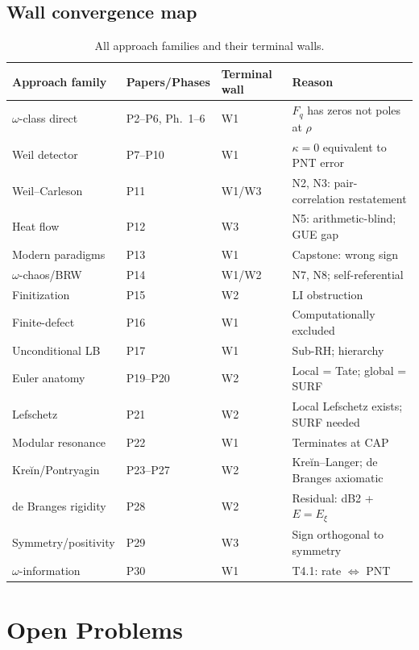 \documentclass[11pt]{amsart}
\theoremstyle{definition}
\theoremstyle{remark}
\newcommand{\om}{\omega}
\newcommand{\kap}{\kappa}
\begin{document}
\subsection{Wall convergence map}

\begin{table}[h]
\renewcommand{\arraystretch}{1.4}
\centering
\begin{tabular}{llll}
\toprule
Approach family & Papers/Phases & Terminal wall & Reason \\
\midrule
$\om$-class direct & P2--P6, Ph.~1--6 & W1 & $F_q$ has zeros not poles at $\rho$ \\
Weil detector & P7--P10 & W1 & $\kap=0$ equivalent to PNT error \\
Weil--Carleson & P11 & W1/W3 & N2, N3: pair-correlation restatement \\
Heat flow & P12 & W3 & N5: arithmetic-blind; GUE gap \\
Modern paradigms & P13 & W1 & Capstone: wrong sign \\
$\om$-chaos/BRW & P14 & W1/W2 & N7, N8; self-referential \\
Finitization & P15 & W2 & LI obstruction \\
Finite-defect & P16 & W1 & Computationally excluded \\
Unconditional LB & P17 & W1 & Sub-RH; hierarchy \\
Euler anatomy & P19--P20 & W2 & Local = Tate; global = SURF \\
Lefschetz & P21 & W2 & Local Lefschetz exists; SURF needed \\
Modular resonance & P22 & W1 & Terminates at CAP \\
Kreĭn/Pontryagin & P23--P27 & W2 & Kreĭn--Langer; de Branges axiomatic \\
de Branges rigidity & P28 & W2 & Residual: dB2 + $E=E_\xi$ \\
Symmetry/positivity & P29 & W3 & Sign orthogonal to symmetry \\
$\om$-information & P30 & W1 & T4.1: rate $\Leftrightarrow$ PNT \\
\bottomrule
\end{tabular}
\caption{All approach families and their terminal walls.}
\label{tab:walls}
\end{table}

\section{Open Problems}
\label{sec:open}
\end{document}
